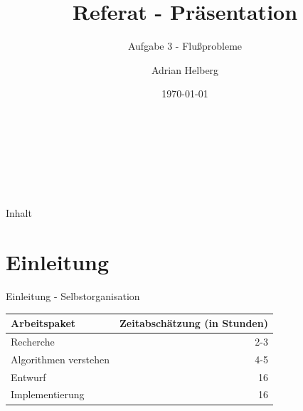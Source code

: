 \documentclass{beamer}
\author{Adrian Helberg}
\title{Referat - Pr\"asentation}
\subtitle{Aufgabe 3 - Flu\ss{}probleme}
\date{\today}
\begin{document}
    \begin{frame}[plain]
        \maketitle
        \small
        \\~\\~\\~\\
    \end{frame}

    \begin{frame}{Inhalt}
        \tableofcontents
    \end{frame}

    \section{Einleitung}
    \begin{frame}{Einleitung - Selbstorganisation}
        \begin{center}
            \begin{tabular}{l | r}
                Arbeitspaket & Zeitabsch\"atzung (in Stunden) \\
                \hline
                Recherche & 2-3\\
                Algorithmen verstehen & 4-5\\
                Entwurf & 16\\
                Implementierung & 16
            \end{tabular}
        \end{center}
    \end{frame}
\end{document}
